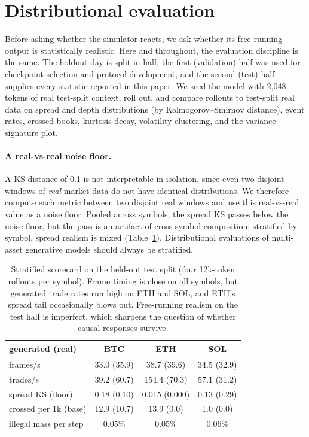 \documentclass[sigconf,anonymous]{acmart}
\begin{document}
\section{Distributional evaluation}
\label{sec:distributional}

Before asking whether the simulator reacts, we ask whether its free-running output is statistically realistic. Here and throughout, the evaluation discipline is the same. The holdout day is split in half; the first (validation) half was used for checkpoint selection and protocol development, and the second (test) half supplies every statistic reported in this paper. We seed the model with 2,048 tokens of real test-split context, roll out, and compare rollouts to test-split real data on spread and depth distributions (by Kolmogorov--Smirnov distance), event rates, crossed books, kurtosis decay, volatility clustering, and the variance signature plot.

\paragraph{A real-vs-real noise floor.} A KS distance of 0.1 is not interpretable in isolation, since even two disjoint windows of \emph{real} market data do not have identical distributions. We therefore compute each metric between two disjoint real windows and use this real-vs-real value as a noise floor. Pooled across symbols, the spread KS passes below the noise floor, but the pass is an artifact of cross-symbol composition; stratified by symbol, spread realism is mixed (Table~\ref{tab:scorecard}). Distributional evaluations of multi-asset generative models should always be stratified.

\begin{table}[t]
\centering
\small
\begin{tabular}{lccc}
\toprule
generated (real) & BTC & ETH & SOL \\
\midrule
frames/s & 33.0 (35.9) & 38.7 (39.6) & 34.5 (32.9) \\
trades/s & 39.2 (60.7) & 154.4 (70.3) & 57.1 (31.2) \\
spread KS (floor) & 0.18 (0.10) & 0.015 (0.000) & 0.13 (0.29) \\
crossed per 1k (base) & 12.9 (10.7) & 13.9 (0.0) & 1.0 (0.0) \\
illegal mass per step & 0.05\% & 0.05\% & 0.06\% \\
\bottomrule
\end{tabular}
\caption{Stratified scorecard on the held-out test split (four 12k-token rollouts per symbol). Frame timing is close on all symbols, but generated trade rates run high on ETH and SOL, and ETH's spread tail occasionally blows out. Free-running realism on the test half is imperfect, which sharpens the question of whether causal responses survive.}
\label{tab:scorecard}
\end{table}
\end{document}
